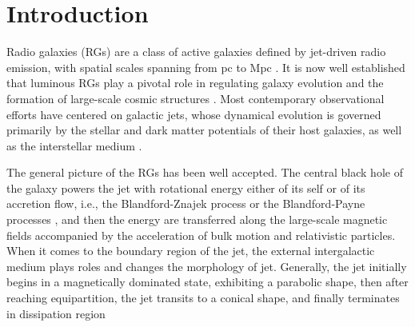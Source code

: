\documentclass{aa}
\begin{document}
   \maketitle

   
\section{Introduction}\label{sec:Introduction}
Radio galaxies (RGs) are a class of active galaxies defined by jet-driven radio emission, with spatial scales spanning from pc to Mpc \citep{hardcastle_radio_2020}. 
It is now well established that luminous RGs play a pivotal role in regulating galaxy evolution and the formation of large-scale cosmic structures \citep{miley_distant_2008}. Most contemporary observational efforts have centered on galactic jets, whose dynamical evolution is governed primarily by the stellar and dark matter potentials of their host galaxies, as well as the interstellar medium \citep{blandford_relativistic_2019}. 

The general picture of the RGs has been well accepted. The central black hole of the galaxy powers the jet with rotational energy either of its self or of its accretion flow, i.e., the Blandford-Znajek process or the Blandford-Payne processes \citep{BZ77,BP82}, and then the energy are transferred along the large-scale magnetic fields accompanied by the acceleration of bulk motion and relativistic particles. When it comes to the boundary region of the jet, the external intergalactic medium plays roles and changes the morphology of jet. Generally, the jet initially begins in a magnetically dominated state, exhibiting a parabolic shape, then after reaching equipartition, the jet transits to a conical shape, and finally terminates in dissipation region \citep[e.g.,][and references therein]{BlandfordRees1978,ghisellini_bulk_1989,blandford_relativistic_2019}
\end{document}

